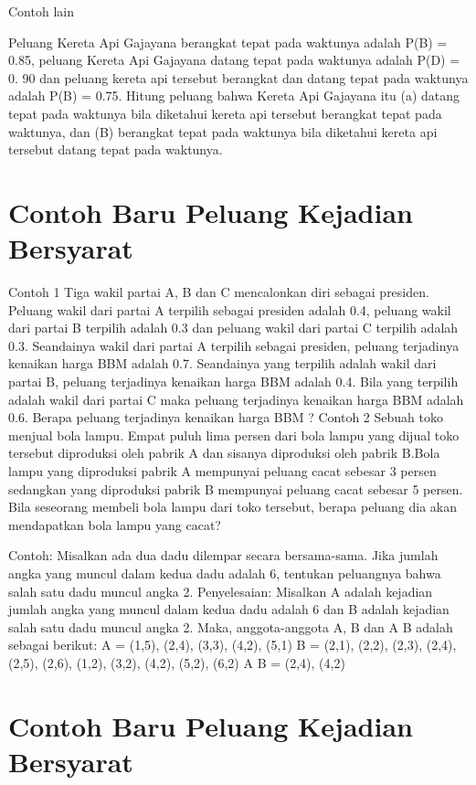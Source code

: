 \documentclass[11pt,fleqn]{book} %
\begin{document}
{{Contoh lain

Peluang Kereta Api Gajayana berangkat tepat pada waktunya adalah P(B) = 0.85, peluang Kereta Api Gajayana datang tepat pada waktunya adalah P(D) = 0. 90 dan peluang kereta api tersebut berangkat dan datang tepat pada waktunya adalah P(B) = 0.75. Hitung peluang bahwa Kereta Api Gajayana itu (a) datang tepat pada waktunya bila diketahui kereta api tersebut berangkat tepat pada waktunya, dan (B) berangkat tepat pada waktunya bila diketahui kereta api tersebut datang tepat pada waktunya.

\section{Contoh Baru Peluang Kejadian Bersyarat}

Contoh 1
Tiga wakil partai A, B dan C mencalonkan diri sebagai presiden. Peluang wakil dari partai A terpilih sebagai  presiden adalah 0.4, peluang wakil dari partai B terpilih  adalah 0.3 dan peluang wakil dari partai C terpilih adalah 0.3. Seandainya wakil dari partai A terpilih sebagai presiden, peluang terjadinya kenaikan harga BBM adalah 0.7. Seandainya yang terpilih adalah wakil dari partai B, peluang terjadinya kenaikan harga BBM adalah 0.4. Bila yang terpilih adalah wakil dari partai C maka peluang terjadinya kenaikan harga BBM adalah 0.6. Berapa peluang terjadinya kenaikan harga BBM ? 
Contoh 2
Sebuah toko menjual bola lampu. Empat puluh lima persen dari bola lampu yang dijual toko tersebut diproduksi oleh pabrik A dan sisanya diproduksi oleh pabrik B.Bola lampu yang diproduksi pabrik A mempunyai peluang cacat sebesar 3 persen sedangkan yang diproduksi pabrik B mempunyai peluang cacat sebesar 5 persen. Bila seseorang membeli bola lampu dari toko tersebut, berapa peluang dia akan mendapatkan bola lampu yang cacat? 

Contoh:
Misalkan ada dua dadu dilempar secara bersama-sama. Jika jumlah angka yang muncul dalam kedua dadu adalah 6, tentukan peluangnya bahwa salah satu dadu muncul angka 2.
Penyelesaian:
Misalkan A adalah kejadian jumlah angka yang muncul dalam kedua dadu adalah 6 dan B adalah kejadian salah satu dadu muncul angka 2. Maka, anggota-anggota A, B dan A  B adalah sebagai berikut:
A = {(1,5), (2,4), (3,3), (4,2), (5,1)}
B = {(2,1), (2,2), (2,3), (2,4), (2,5), (2,6), (1,2), (3,2), (4,2), (5,2), (6,2)} 
A  B = {(2,4), (4,2)}


\section{Contoh Baru Peluang Kejadian Bersyarat}

}}
\end{document}
